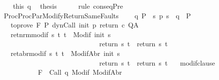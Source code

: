 \begin{isabellebody}
\ \ \isamarkupfalse%
\ this\ q\ \isamarkupfalse%
\ {\isacharquery}thesis\isanewline
\ \ \ \ \isamarkupfalse%
\ {\isacharparenleft}rule\ conseqPre{\isacharparenright}\ \isanewline
{}\isamarkupfalse%
%
\endisatagproof
{\isafoldproof}%
%
\isadelimproof
\isanewline
%
\endisadelimproof
\isanewline
\isanewline
{}\isamarkupfalse%
\ ProcProcParModifyReturnSameFaults{\isacharcolon}\ \isanewline
\ \ \ q{\isacharcolon}\ {\isachardoublequoteopen}P\ {\isasymsubseteq}\ {\isacharbraceleft}s{\isachardot}\ p\ s\ {\isacharequal}\ q{\isacharbraceright}\ {\isasyminter}\ P{\isacharprime}{\isachardoublequoteclose}\isanewline
\ \ \ %
\isanewline
\ \ \ to{\isacharunderscore}prove{\isacharcolon}\ {\isachardoublequoteopen}{\isasymGamma}{\isacharcomma}{\isasymTheta}{\isasymturnstile}\isactrlbsub {\isacharslash}F\isactrlesub \ P{\isacharprime}\ {\isacharparenleft}dynCall\ init\ p\ return{\isacharprime}\ c{\isacharparenright}\ Q{\isacharcomma}A{\isachardoublequoteclose}\isanewline
\ \ \ ret{\isacharunderscore}nrm{\isacharunderscore}modif{\isacharcolon}\ {\isachardoublequoteopen}{\isasymforall}s\ t{\isachardot}\ t\ {\isasymin}\ {\isacharparenleft}Modif\ {\isacharparenleft}init\ s{\isacharparenright}{\isacharparenright}\ \isanewline
\ \ \ \ \ \ \ \ \ \ \ \ \ \ \ \ \ \ \ \ \ \ \ \ \ \ \ \ {\isasymlongrightarrow}\ return{\isacharprime}\ s\ t\ {\isacharequal}\ return\ s\ t{\isachardoublequoteclose}\isanewline
\ \ \ ret{\isacharunderscore}abr{\isacharunderscore}modif{\isacharcolon}\ {\isachardoublequoteopen}{\isasymforall}s\ t{\isachardot}\ t\ {\isasymin}\ {\isacharparenleft}ModifAbr\ {\isacharparenleft}init\ s{\isacharparenright}{\isacharparenright}\ \isanewline
\ \ \ \ \ \ \ \ \ \ \ \ \ \ \ \ \ \ \ \ \ \ \ \ \ \ \ \ {\isasymlongrightarrow}\ return{\isacharprime}\ s\ t\ {\isacharequal}\ return\ s\ t{\isachardoublequoteclose}\isanewline
\ \ \ modif{\isacharunderscore}clause{\isacharcolon}\ \isanewline
\ \ \ \ \ \ \ \ \ \ {\isachardoublequoteopen}{\isasymforall}{\isasymsigma}{\isachardot}\ {\isasymGamma}{\isacharcomma}{\isasymTheta}{\isasymturnstile}\isactrlbsub {\isacharslash}F\isactrlesub \ {\isacharbraceleft}{\isasymsigma}{\isacharbraceright}\ Call\ q\ {\isacharparenleft}Modif\ {\isasymsigma}{\isacharparenright}{\isacharcomma}{\isacharparenleft}ModifAbr\ {\isasymsigma}{\isacharparenright}{\isachardoublequoteclose}\isanewline

\end{isabellebody}
